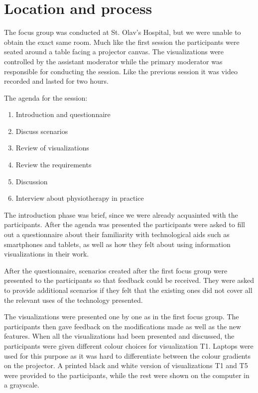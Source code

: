 \section{Location and process}
The focus group was conducted at St. Olav's Hospital, but we were unable to obtain the exact same room.  Much like the first session the participants were seated around a table facing a projector canvas. The visualizations were controlled by the assistant moderator while the primary moderator was responsible for conducting the session. Like the previous session it was video recorded and lasted for two hours.

The agenda for the session:
\vspace{-6mm}
\begin{enumerate}[itemsep=0cm, parsep=0cm]
  \item Introduction and questionnaire
  \item Discuss scenarios
  \item Review of visualizations
  \item Review the requirements
  \item Discussion
  \item Interview about physiotherapy in practice
\end{enumerate}

The introduction phase was brief, since we were already acquainted with the participants. After the agenda was presented the participants were asked to fill out a questionnaire about their familiarity with technological aids such as smartphones and tablets, as well as how they felt about using information visualizations in their work. 

After the questionnaire, scenarios created after the first focus group were presented to the participants so that feedback could be received. They were asked to provide additional scenarios if they felt that the existing ones did not cover all the relevant uses of the technology presented.

The visualizations were presented one by one as in the first focus group. The participants then gave feedback on the modifications made as well as the new features. When all the visualizations had been presented and discussed, the participants were given different colour choices for visualization T1. Laptops were used for this purpose as it was hard to differentiate between the colour gradients on the projector. A printed black and white version of visualizations T1 and T5 were provided to the participants, while the rest were shown on the computer in a grayscale.

